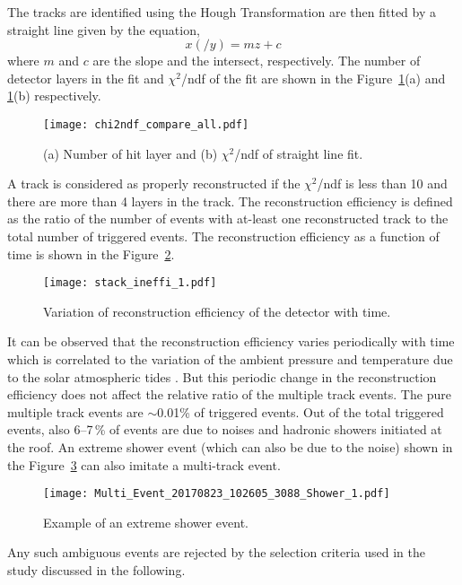 The tracks are identified using the Hough Transformation are then
fitted by a straight line given by the equation,
\begin{equation}
  x\left(/y\right)=mz+c \label{eq:plain}
\end{equation}
where $m$ and $c$ are the slope and the intersect, respectively.
The number of detector layers in the fit and $\chi^{2}$/ndf of
the fit are shown in the Figure~\ref{fig:chi2ndf}(a) and
\ref{fig:chi2ndf}(b) respectively.
\begin{figure}[h]
  \texttt{[image: chi2ndf\_compare\_all.pdf]} 
  \caption{(a) Number of hit layer and
    (b) $\chi^2$/ndf of straight line fit.}
  \label{fig:chi2ndf}
\end{figure}
A track is considered as properly reconstructed if the $\chi^{2}$/ndf
is less than 10 and there are more than 4 layers in the track.
The reconstruction efficiency is defined as the ratio of the number
of events with at-least one reconstructed track to the total number
of triggered events. The reconstruction efficiency as a function of 
time is shown in the Figure~\ref{fig:stackineffi}.
\begin{figure}[h]
  \texttt{[image: stack\_ineffi\_1.pdf]} 
  \caption{Variation of reconstruction efficiency of the detector
    with time.}
  \label{fig:stackineffi}
\end{figure}
It can be observed that the reconstruction efficiency varies
periodically with time which is correlated to the variation
of the ambient pressure and temperature due to the solar
atmospheric tides \cite{rpcleak}. But this periodic change in 
the reconstruction efficiency does not affect the relative ratio of
the multiple track events. The pure multiple track events are
$\sim$0.01\% of triggered events. Out of the total triggered events,
also 6--7\,\% of events are due to noises and hadronic showers
initiated at the roof.
An extreme shower event (which can also be due to the noise) shown
in the Figure~\ref{fig:eshower} can also imitate a multi-track event.
\begin{figure}[h]
\texttt{[image: Multi\_Event\_20170823\_102605\_3088\_Shower\_1.pdf]} 
 \caption{Example of an extreme shower event.}
 \label{fig:eshower}
\end{figure}
Any such ambiguous events are rejected by the selection criteria
used in the study discussed in the following.

